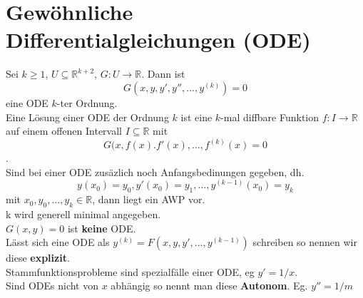 \section{Gewöhnliche Differentialgleichungen (ODE)}
  Sei $k\geq1$, $U\subseteq\mathbb R^{k+2}$, $G:U\rightarrow\mathbb R$. Dann ist 
  $$G(x,y,y',y'',...,y^{(k)})=0$$ eine ODE $k$-ter Ordnung.\\
  Eine Lösung einer ODE der Ordnung $k$ ist eine $k$-mal diffbare Funktion $f:I\rightarrow\mathbb R$
  auf einem offenen Intervall $I\subseteq\mathbb R$ mit $$G(x, f(x). f'(x),...,
  f^{(k)}(x)=0$$.\\
  Sind bei einer ODE zusäzlich noch Anfangsbedinungen gegeben, dh.
  $$y(x_0)=y_0,y'(x_0)=y_1,...,y^{(k-1)}(x_0)=y_k$$ mit $x_0,
  y_0,...,y_k\in\mathbb R$, dann liegt ein AWP vor.\\
   k wird generell minimal angegeben. \\
  $G(x, y)=0$ ist \textbf{keine} ODE.\\
  Lässt sich eine ODE als $y^{(k)}=F(x,y,y',...,y^{(k-1)})$ schreiben so nennen
  wir diese \textbf{explizit}.\\
  Stammfunktionsprobleme sind spezialfälle einer ODE, eg $y'=1/x$.\\
  Sind ODEs nicht von $x$ abhängig so nennt man diese \textbf{Autonom}. Eg.
  $y''=1/m$\\
